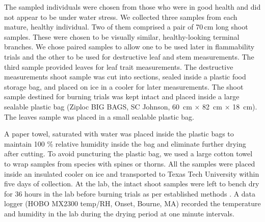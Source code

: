 \documentclass{bmcart}
\begin{document}
The sampled individuals were chosen from those who were in good health and did not appear to be under water stress. We collected three samples from each mature, healthy individual. Two of them comprised a pair of 70\,cm long shoot samples. These were chosen to be visually similar, healthy-looking terminal branches. We chose paired samples to allow one to be used later in flammability trials and the other to be used for destructive leaf and stem measurements. The third sample provided leaves for leaf trait measurements. The destructive measurements shoot sample was cut into sections, sealed inside a plastic food storage bag, and placed on ice in a cooler for later measurements. The shoot sample destined for burning trials was kept intact and placed inside a large sealable plastic bag (Ziploc BIG BAGS, SC Johnson, 60 \,cm × 82 \,cm × 18 \,cm). The leaves sample was placed in a small sealable plastic bag.

A paper towel, saturated with water was placed inside the plastic bags to maintain 100 \% relative humidity inside the bag and eliminate further drying after cutting. To avoid puncturing the plastic bag, we used a large cotton towel to wrap samples from species with spines or thorns. All the samples were placed inside an insulated cooler on ice and transported to Texas Tech University within five days of collection.  
At the lab, the intact shoot samples were left to bench dry for 36 hours in the lab before burning trials  as per established methods \citep{wyse2016quantitative}. A data logger (HOBO MX2300 temp/RH, Onset, Bourne, MA) recorded the temperature and humidity in the lab during the drying period at one minute intervals.
\end{document}
